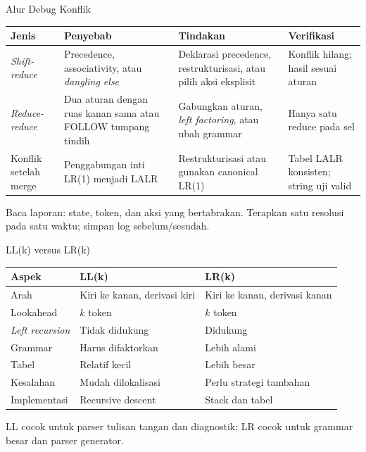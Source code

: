\documentclass[aspectratio=169,10pt,t]{beamer}
\begin{document}
\begin{frame}{Alur Debug Konflik}
  \scriptsize
  \setlength{\tabcolsep}{4pt}
  \begin{tabular}{@{}p{2.6cm}p{4.2cm}p{4.2cm}p{2.6cm}@{}}
    \toprule
    \textbf{Jenis} & \textbf{Penyebab} & \textbf{Tindakan} &
      \textbf{Verifikasi} \\
    \midrule
    \textit{Shift-reduce} & Precedence, associativity, atau
      \textit{dangling else} &
      Deklarasi precedence, restrukturisasi, atau pilih aksi eksplisit &
      Konflik hilang; hasil sesuai aturan \\
    \textit{Reduce-reduce} & Dua aturan dengan ruas kanan sama atau
      FOLLOW tumpang tindih &
      Gabungkan aturan, \textit{left factoring}, atau ubah grammar &
      Hanya satu reduce pada sel \\
    Konflik setelah merge & Penggabungan inti LR(1) menjadi LALR &
      Restrukturisasi atau gunakan canonical LR(1) &
      Tabel LALR konsisten; string uji valid \\
    \bottomrule
  \end{tabular}

  \vspace{4pt}
  {\scriptsize Baca laporan: state, token, dan aksi yang bertabrakan.
  Terapkan satu resolusi pada satu waktu; simpan log sebelum/sesudah.}
\end{frame}

\begin{frame}{LL(k) versus LR(k)}
  \scriptsize
  \setlength{\tabcolsep}{4pt}
  \begin{tabular}{@{}p{2.8cm}p{5.2cm}p{6.0cm}@{}}
    \toprule
    \textbf{Aspek} & \textbf{LL(k)} & \textbf{LR(k)} \\
    \midrule
    Arah & Kiri ke kanan, derivasi kiri & Kiri ke kanan, derivasi kanan \\
    Lookahead & \(k\) token & \(k\) token \\
    \textit{Left recursion} & Tidak didukung & Didukung \\
    Grammar & Harus difaktorkan & Lebih alami \\
    Tabel & Relatif kecil & Lebih besar \\
    Kesalahan & Mudah dilokalisasi & Perlu strategi tambahan \\
    Implementasi & Recursive descent & Stack dan tabel \\
    \bottomrule
  \end{tabular}

  \vspace{4pt}
  {\scriptsize\color{ubbblue!75}LL cocok untuk parser tulisan tangan
  dan diagnostik; LR cocok untuk grammar besar dan parser generator.}
\end{frame}
\end{document}

